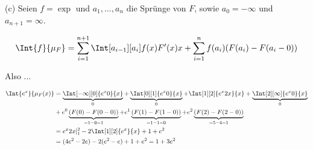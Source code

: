 \begin{solution}
(c) Seien $f = \exp$ und $a_1, \ldots, a_n$ die Sprünge von $F$, sowie $a_0 = - \infty$ und $a_{n+1} = \infty$.

\begin{align*}
  \Int{f}{\mu_F}
  =
  \sum_{i=1}^{n+1} \Int[a_{i-1}][a_i]{f(x) F^\prime(x)}{x} +
  \sum_{i=1}^n f(a_i) (F(a_i) - F(a_i - 0))
\end{align*}

Also ...

\begin{align*}
  \Int{e^x}{\mu_F(x)}
  & =
  \underbrace{\Int[-\infty][0]{e^x 0}{x}}_0
  +
  \underbrace{\Int[0][1]{e^x 0}{x}}_0
  +
  \Int[1][2]{e^x 2x}{x}
  +
  \underbrace{\Int[2][\infty]{e^x 0}{x}}_0 \\
  & +
  e^0 \underbrace{(F(0) - F(0 - 0))}_{= 1-0 = 1}
  +
  e^1 \underbrace{(F(1) - F(1 - 0))}_{= 1-1 = 0}
  +
  e^2 \underbrace{(F(2) - F(2 - 0))}_{= 5-4 = 1} \\
  & =
  e^x 2x |_1^2 - 2 \Int[1][2]{e^x}{x} + 1 + e^2 \\
  & =
  (4e^2 - 2e) - 2 (e^2 - e) + 1 + e^2
  =
  1 + 3e^2
\end{align*}

\end{solution}

